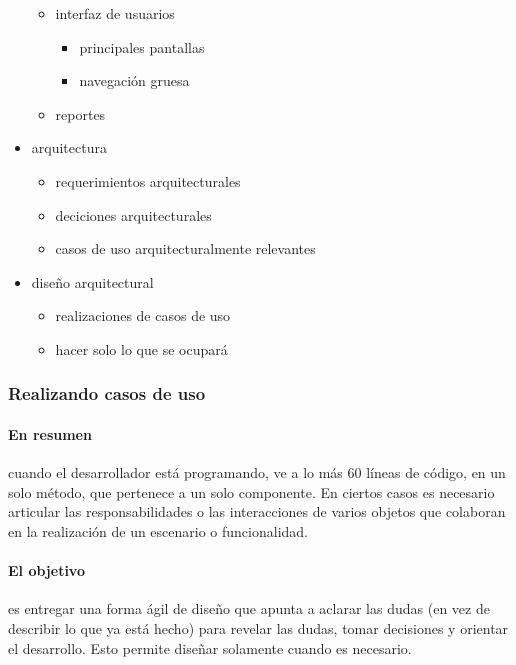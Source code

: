 \documentclass[11pt]{article}
\begin{document}
\begin{itemize}
\begin{itemize}
\begin{itemize}
          \end{itemize}
\item     interfaz de usuarios
          \begin{itemize}
\item         principales pantallas
\item         navegaci\'on gruesa
          \end{itemize}
\item     reportes
      \end{itemize}
\item arquitectura
      \begin{itemize}
\item     requerimientos arquitecturales
\item     deciciones arquitecturales
\item     casos de uso arquitecturalmente relevantes
      \end{itemize}
\item dise\~no arquitectural
      \begin{itemize}
\item     realizaciones de casos de uso
\item     hacer solo lo que se ocupar\'a
      \end{itemize}
\end{itemize}

\subsubsection*{Realizando casos de uso}

\paragraph{En resumen} cuando el desarrollador est\'a programando, ve a lo m\'as 60 l\'ineas de c\'odigo, en un solo m\'etodo, que pertenece a un solo componente. En ciertos casos es necesario articular las responsabilidades o las interacciones de varios objetos que colaboran en la realizaci\'on de un escenario o funcionalidad.

\paragraph{El objetivo} es entregar una forma \'agil de dise\~no que apunta a aclarar las dudas (en vez de describir lo que ya est\'a hecho) para revelar las dudas, tomar decisiones y orientar el desarrollo. Esto permite dise\~nar solamente cuando es necesario.
\end{document}
